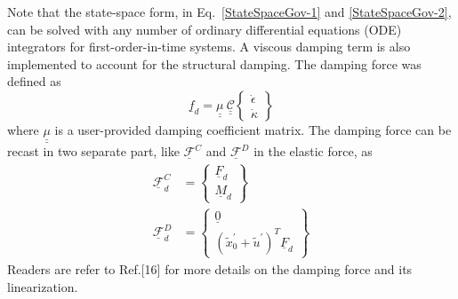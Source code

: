\documentclass{aiaa-tc}
\newcommand{\tens}[1]{\underline{\underline{#1}}}
\renewcommand{\vec}[1]{\underline{#1}}
\begin{document}
Note that the state-space form, in
Eq.~\eqref{StateSpaceGov-1} and \eqref{StateSpaceGov-2}, can be solved with
any number of ordinary differential equations (ODE) integrators
for first-order-in-time systems. A viscous damping term is also implemented to account for the structural damping. The damping force was defined as
\begin{equation}
   \label{Damping}
   \vec{f}_d = \tens{\mu}~ \tens{\mathcal{C}} \begin{Bmatrix}
   \dot{\epsilon} \\
   \dot{\kappa}
   \end{Bmatrix}
\end{equation}
where $ \tens{\mu}$ is a user-provided damping coefficient matrix. The damping force can be recast in two separate part, like $\vec{\mathcal{F}}^C$ and $\vec{\mathcal{F}}^D$ in the elastic force, as
\begin{align}
   \label{DampingForce-1}
   \vec{\mathcal{F}}^C_d &= \begin{Bmatrix}
   \vec{F}_d \\
   \vec{M}_d
   \end{Bmatrix} \\
   \label{DampingForce-2}
   \vec{\mathcal{F}}^D_d &= \begin{Bmatrix}
    \vec{0} \\
    (\tilde{x}^\prime_0 + \tilde{u}^\prime)^T \underline{F}_d
    \end{Bmatrix}   
\end{align}
Readers are refer to Ref.[16] for more details on the damping force and its linearization.
\end{document}
